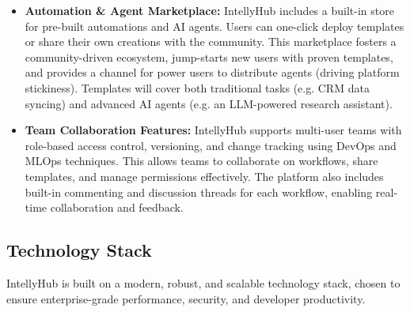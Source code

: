 \documentclass[11pt, a4paper, oneside]{article}
\begin{document}
\begin{itemize}
    \item \textbf{Automation \& Agent Marketplace:} IntellyHub includes a built-in store for pre-built automations and AI agents. Users can one-click deploy templates or share their own creations with the community. This marketplace fosters a community-driven ecosystem, jump-starts new users with proven templates, and provides a channel for power users to distribute agents (driving platform stickiness). Templates will cover both traditional tasks (e.g. CRM data syncing) and advanced AI agents (e.g. an LLM-powered research assistant).
    
    \item \textbf{Team Collaboration Features:} IntellyHub supports multi-user teams with role-based access control, versioning, and change tracking using DevOps and MLOps techniques. This allows teams to collaborate on workflows, share templates, and manage permissions effectively. The platform also includes built-in commenting and discussion threads for each workflow, enabling real-time collaboration and feedback.
\end{itemize}

\subsection{Technology Stack}
IntellyHub is built on a modern, robust, and scalable technology stack, chosen to ensure enterprise-grade performance, security, and developer productivity.
\end{document}
